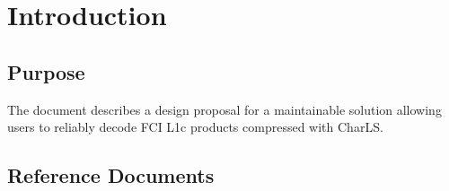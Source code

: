 \documentclass[a4paper,10pt,english]{sphinxmanual}
\begin{document}
\begin{savenotes}\sphinxatlongtablestart{}\sphinxatlongtableend\end{savenotes}


\chapter{Introduction}
\label{\detokenize{introduction:introduction}}\label{\detokenize{introduction::doc}}

\section{Purpose}
\label{\detokenize{introduction:purpose}}
\sphinxAtStartPar
The document describes a design proposal for a maintainable solution allowing users to reliably decode FCI L1c products
compressed with CharLS.


\section{Reference Documents}
\label{\detokenize{introduction:reference-documents}}
\end{document}
